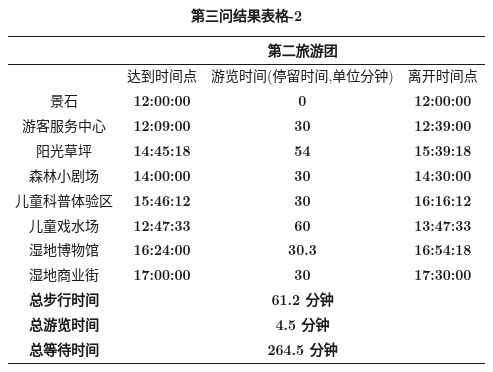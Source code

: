 \documentclass[hyperref,UTF8]{article}
\begin{document}
{\begin{table}[htbp]
  \centering
  \caption{\textbf{第三问结果表格-2}}
  \begin{tabular}{|c|c|c|c|}
    \hline
    \multicolumn{1}{|r|}{} & \multicolumn{3}{c|}{\textbf{第二旅游团}} \bigstrut\\
    \hline
    \multicolumn{1}{|r|}{} & 达到时间点 & \multicolumn{1}{p{4.055em}|}{游览时间(停留时间,单位分钟)} & \multicolumn{1}{p{4.055em}|}{离开时间点} \bigstrut\\
    \hline
    景石 & \multicolumn{1}{c|}{\textbf{12:00:00}} & \textbf{0} & \textbf{12:00:00} \bigstrut\\
    \hline
    游客服务中心 & \multicolumn{1}{c|}{\textbf{12:09:00}} & \textbf{30} & \textbf{12:39:00} \bigstrut\\
    \hline
    阳光草坪 & \multicolumn{1}{c|}{\textbf{14:45:18}} & \textbf{54} & \textbf{15:39:18} \bigstrut\\
    \hline
    森林小剧场 & \multicolumn{1}{c|}{\textbf{14:00:00}} & \textbf{30} & \textbf{14:30:00} \bigstrut\\
    \hline
    儿童科普体验区 & \multicolumn{1}{c|}{\textbf{15:46:12}} & \textbf{30} & \textbf{16:16:12} \bigstrut\\
    \hline
    儿童戏水场 & \multicolumn{1}{c|}{\textbf{12:47:33}} & \textbf{60} & \textbf{13:47:33} \bigstrut\\
    \hline
    湿地博物馆 & \multicolumn{1}{c|}{\textbf{16:24:00}} & \textbf{30.3} & \textbf{16:54:18} \bigstrut\\
    \hline
    湿地商业街 & \multicolumn{1}{c|}{\textbf{17:00:00}} & \textbf{30} & \textbf{17:30:00} \bigstrut\\
    \hline
    \textbf{总步行时间} & \multicolumn{3}{c|}{\textbf{61.2 分钟}} \bigstrut\\
    \hline
    \textbf{总游览时间} & \multicolumn{3}{c|}{\textbf{4.5 分钟}} \bigstrut\\
    \hline
    \textbf{总等待时间} & \multicolumn{3}{c|}{\textbf{264.5 分钟}} \bigstrut\\
    \hline
    \end{tabular}%
  \label{tab:addlabel-2}%
\end{table}%


}
\end{document}
